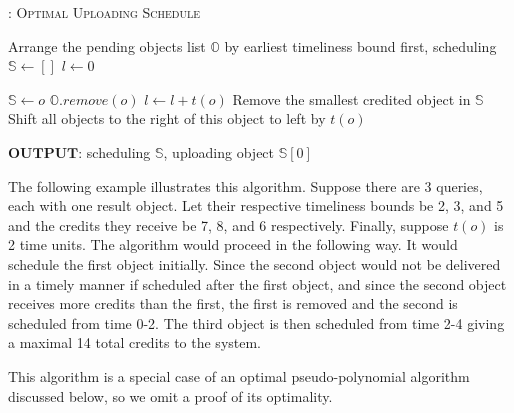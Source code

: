 \begin{algorithm}[H]
\caption{: \textsc{Optimal Uploading Schedule}} \label{alg:opt}
\begin{small}
\begin{algorithmic}[1]
\STATE Arrange the pending objects list $\mathbb{O}$ by earliest timeliness bound first, scheduling $\mathbb{S}\leftarrow[]$
\STATE $l\leftarrow 0$

        \STATE $\mathbb{S}\leftarrow o$
        \STATE $\mathbb{O}.remove(o)$
                \STATE $l\leftarrow l+t(o)$
        \ELSE
                \STATE Remove the smallest credited object in $\mathbb{S}$
                \STATE Shift all objects to the right of this object to left by $t(o)$
        \ENDIF
\ENDFOR
\end{algorithmic}
\end{small}
$\textbf{OUTPUT}$: scheduling $\mathbb{S}$, uploading object $\mathbb{S}[0]$
\end{algorithm}

The following example illustrates this algorithm.
%
Suppose there are 3 queries, each with one result object.
%
Let their respective timeliness bounds be 2, 3, and 5 and the credits
they receive be 7, 8, and 6 respectively.
%
Finally, suppose $t(o)$ is 2 time units.
%
The algorithm would proceed in the following way.
%
It would schedule the first object initially.
%
Since the second object would not be delivered in a timely manner if
scheduled after the first object, and since the second object receives
more credits than the first, the first is removed and the second is
scheduled from time 0-2.
%
The third object is then scheduled from time 2-4 giving a maximal 14
total credits to the system.
%


This algorithm is a special case of an optimal pseudo-polynomial
algorithm discussed below, so we omit a proof of its optimality.




